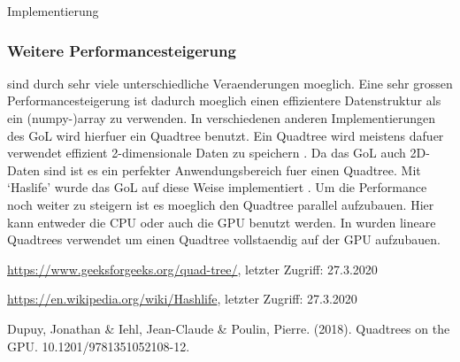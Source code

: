 \documentclass[runningheads]{llncs}
\begin{document}
\begin{section}{Implementierung}
    \subsubsection{Weitere Performancesteigerung}
        sind durch sehr viele unterschiedliche Veraenderungen moeglich.
        Eine sehr grossen Performancesteigerung ist dadurch moeglich einen effizientere Datenstruktur als ein (numpy-)array zu verwenden.
        In verschiedenen anderen Implementierungen des GoL wird hierfuer ein Quadtree benutzt.
        Ein Quadtree wird meistens dafuer verwendet effizient 2-dimensionale Daten zu speichern \cite{quadtreeGeeksForGeeks}.
        Da das GoL auch 2D-Daten sind ist es ein perfekter Anwendungsbereich fuer einen Quadtree.
        Mit `Haslife' wurde das GoL auf diese Weise implementiert \cite{haslifeWiki}. \newline
        Um die Performance noch weiter zu steigern ist es moeglich den Quadtree parallel aufzubauen.
        Hier kann entweder die CPU oder auch die GPU benutzt werden.
        In \cite{quadtreesOnGPU} wurden lineare Quadtrees verwendet um einen Quadtree vollstaendig auf der GPU aufzubauen.

\end{section}


\begin{thebibliography}{8}
    \url{https://www.geeksforgeeks.org/quad-tree/}, letzter Zugriff: 27.3.2020

    \url{https://en.wikipedia.org/wiki/Hashlife}, letzter Zugriff: 27.3.2020

    Dupuy, Jonathan \& Iehl, Jean-Claude \& Poulin, Pierre. (2018).
    Quadtrees on the GPU. 10.1201/9781351052108-12. 

\end{thebibliography}
\end{document}
